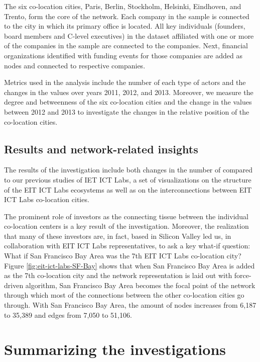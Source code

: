The six co-location cities, Paris, Berlin, Stockholm, Helsinki, Eindhoven, and Trento, form the core of the network. Each company in the sample is connected to the city in which its primary office is located. All key individuals (founders, board members and C-level executives) in the dataset affiliated with one or more of the companies in the sample are connected to the companies. Next, financial organizations identified with funding events for those companies are added as nodes and connected to respective companies. 

Metrics used in the analysis include the number of each type of actors and the changes in the values over years 2011, 2012, and 2013. Moreover, we measure the degree and betweenness of the six co-location cities and the change in the values between 2012 and 2013 to investigate the changes in the relative position of the co-location cities.

\subsection{Results and network-related insights}

The results of the investigation include both changes in the number of compared to our previous studies of IET ICT Labs, a set of visualizations on the structure of the EIT ICT Labs ecosystems as well as on the interconnections between EIT ICT Labs co-location cities. 

The prominent role of investors as the connecting tissue between the individual co-location centers is a key result of the investigation. Moreover, the realization that many of these investors are, in fact, based in Silicon Valley led us, in collaboration with EIT ICT Labs representatives, to ask a key what-if question: What if San Francisco Bay Area was the 7th EIT ICT Labs co-location city? Figure \ref{fig:eit-ict-labs-SF-Bay} shows that when San Francisco Bay Area is added as the 7th co-location city and the network representation is laid out with force-driven algorithm, San Francisco Bay Area becomes the focal point of the network through which most of the connections between the other co-location cities go through. With San Francisco Bay Area, the amount of nodes increases from 6,187 to 35,389 and edges from 7,050 to 51,106.

\section{Summarizing the investigations}

